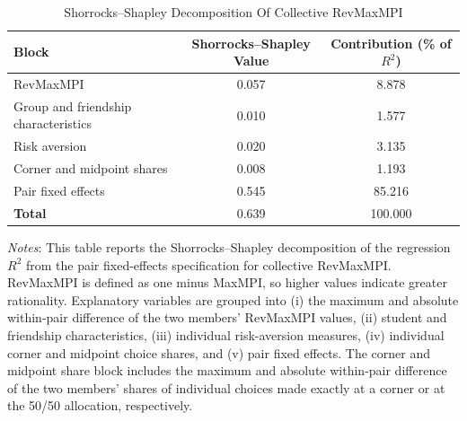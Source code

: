 \begin{table}[H]
\centering
\caption{Shorrocks--Shapley Decomposition Of Collective RevMaxMPI}
\label{tab:shapley_collective_revmaxmpi}
\begin{tabular}{lcc}
\toprule \hline
Block
    & Shorrocks--Shapley Value
    & Contribution (\% of $R^2$) \\
\midrule
RevMaxMPI                             & 0.057 & 8.878 \\
Group and friendship characteristics & 0.010 & 1.577 \\
Risk aversion                         & 0.020 & 3.135 \\
Corner and midpoint shares            & 0.008 & 1.193 \\
Pair fixed effects                    & 0.545 & 85.216 \\
\midrule
\textbf{Total}                        & 0.639 & 100.000 \\
\hline \bottomrule
\end{tabular}
\begin{minipage}{\textwidth}
{\footnotesize \emph{Notes}: This table reports the Shorrocks--Shapley decomposition of the regression $R^2$ from the pair fixed-effects specification for collective RevMaxMPI. RevMaxMPI is defined as one minus MaxMPI, so higher values indicate greater rationality. Explanatory variables are grouped into (i) the maximum and absolute within-pair difference of the two members' RevMaxMPI values, (ii) student and friendship characteristics, (iii) individual risk-aversion measures, (iv) individual corner and midpoint choice shares, and (v) pair fixed effects. The corner and midpoint share block includes the maximum and absolute within-pair difference of the two members' shares of individual choices made exactly at a corner or at the 50/50 allocation, respectively.}
\end{minipage}
\end{table}
